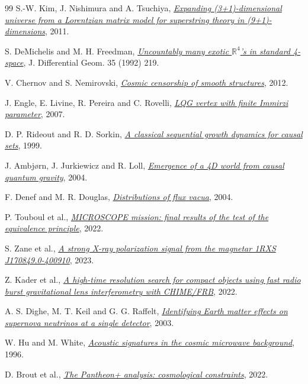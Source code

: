 \begin{thebibliography}{99}
 S.-W. Kim, J. Nishimura and A. Tsuchiya, \href{https://arxiv.org/abs/1108.1540}{\emph{Expanding (3+1)-dimensional universe from a Lorentzian matrix model for superstring theory in (9+1)-dimensions}}, 2011.

 S. DeMichelis and M. H. Freedman, \href{https://doi.org/10.4310/jdg/1214447810}{\emph{Uncountably many exotic \(\mathbb R^4\)'s in standard 4-space}}, J. Differential Geom. 35 (1992) 219.

 V. Chernov and S. Nemirovski, \href{https://arxiv.org/abs/1201.6070}{\emph{Cosmic censorship of smooth structures}}, 2012.

 J. Engle, E. Livine, R. Pereira and C. Rovelli, \href{https://arxiv.org/abs/0711.0146}{\emph{LQG vertex with finite Immirzi parameter}}, 2007.

 D. P. Rideout and R. D. Sorkin, \href{https://arxiv.org/abs/gr-qc/9904062}{\emph{A classical sequential growth dynamics for causal sets}}, 1999.

 J. Ambj\o rn, J. Jurkiewicz and R. Loll, \href{https://arxiv.org/abs/hep-th/0404156}{\emph{Emergence of a 4D world from causal quantum gravity}}, 2004.

 F. Denef and M. R. Douglas, \href{https://arxiv.org/abs/hep-th/0404116}{\emph{Distributions of flux vacua}}, 2004.

 P. Touboul et al., \href{https://arxiv.org/abs/2209.15487}{\emph{MICROSCOPE mission: final results of the test of the equivalence principle}}, 2022.

 S. Zane et al., \href{https://arxiv.org/abs/2301.12919}{\emph{A strong X-ray polarization signal from the magnetar 1RXS J170849.0-400910}}, 2023.

 Z. Kader et al., \href{https://arxiv.org/abs/2204.06014}{\emph{A high-time resolution search for compact objects using fast radio burst gravitational lens interferometry with CHIME/FRB}}, 2022.

 A. S. Dighe, M. T. Keil and G. G. Raffelt, \href{https://arxiv.org/abs/hep-ph/0304150}{\emph{Identifying Earth matter effects on supernova neutrinos at a single detector}}, 2003.

 W. Hu and M. White, \href{https://arxiv.org/abs/astro-ph/9602019}{\emph{Acoustic signatures in the cosmic microwave background}}, 1996.

 D. Brout et al., \href{https://arxiv.org/abs/2202.04077}{\emph{The Pantheon+ analysis: cosmological constraints}}, 2022.


\end{thebibliography}
